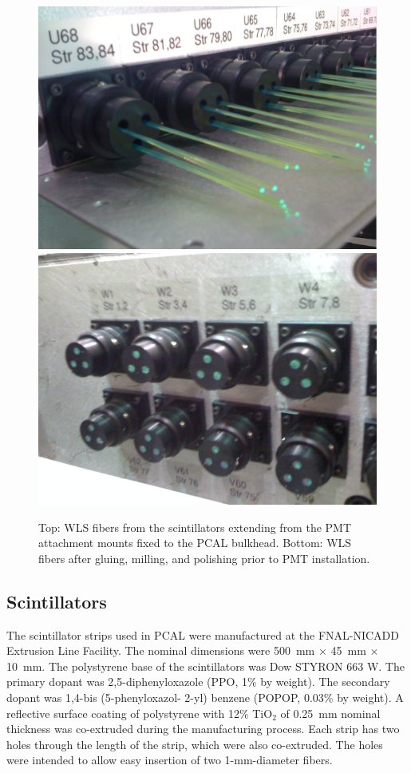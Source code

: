 \begin{figure}[hbt]
\centering
\includegraphics[width=0.9\columnwidth,keepaspectratio]{img/S3_5a.png}
\includegraphics[width=0.9\columnwidth,keepaspectratio]{img/S3_5b.png}
\caption[PCAL UVW Layers]{Top: WLS fibers from the scintillators extending from the PMT attachment mounts
  fixed to the PCAL bulkhead. Bottom: WLS fibers after gluing, milling, and polishing prior to PMT installation.}
\label{fig:S3_5}
\end{figure}

\subsection{Scintillators}

The scintillator strips used in PCAL were manufactured at the FNAL-NICADD Extrusion Line Facility. The
nominal dimensions were 500~mm $\times$ 45~mm $\times$ 10~mm. The polystyrene base of the scintillators
was Dow STYRON 663 W. The primary dopant was 2,5-diphenyloxazole (PPO, 1\% by weight). The secondary
dopant was 1,4-bis (5-phenyloxazol- 2-yl) benzene (POPOP, 0.03\% by weight). A reflective surface coating
of polystyrene with 12\% TiO$_2$ of 0.25~mm nominal thickness was co-extruded during the manufacturing
process. Each strip has two holes through the length of the strip, which were also co-extruded. The holes were
intended to allow easy insertion of two 1-mm-diameter fibers.

